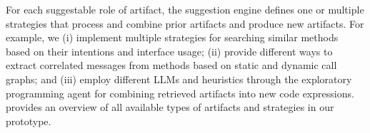 For each suggestable role of artifact, the suggestion engine defines one or multiple strategies that process and combine prior artifacts and produce new artifacts.
For example, we (i) implement multiple strategies for searching similar methods based on their intentions and interface usage; (ii) provide different ways to extract correlated messages from methods based on static and dynamic call graphs; and (iii) employ different LLMs and heuristics through the exploratory programming agent for combining retrieved artifacts into new code expressions.
 provides an overview of all available types of artifacts and strategies in our prototype.
